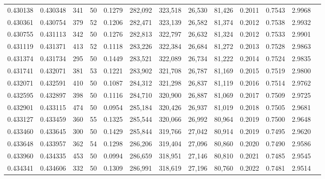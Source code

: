 \begin{tabular}{rrrrrrrrrrrrr}
0.430138 & 0.430348 &   341 &  50 &                                     0.1279 & 282,092 & 323,518 &  26,530 &  81,426 & 0.2011 & 0.7543 & 2.9968 \\
0.430361 & 0.430754 &   379 &  52 &                                     0.1206 & 282,471 & 323,139 &  26,582 &  81,374 & 0.2012 & 0.7538 & 2.9932 \\
0.430755 & 0.431113 &   342 &  50 &                                     0.1276 & 282,813 & 322,797 &  26,632 &  81,324 & 0.2012 & 0.7533 & 2.9901 \\
0.431119 & 0.431371 &   413 &  52 &                                     0.1118 & 283,226 & 322,384 &  26,684 &  81,272 & 0.2013 & 0.7528 & 2.9863 \\
0.431374 & 0.431734 &   295 &  50 &                                     0.1449 & 283,521 & 322,089 &  26,734 &  81,222 & 0.2014 & 0.7524 & 2.9835 \\
0.431741 & 0.432071 &   381 &  53 &                                     0.1221 & 283,902 & 321,708 &  26,787 &  81,169 & 0.2015 & 0.7519 & 2.9800 \\
0.432071 & 0.432591 &   410 &  50 &                                     0.1087 & 284,312 & 321,298 &  26,837 &  81,119 & 0.2016 & 0.7514 & 2.9762 \\
0.432595 & 0.432897 &   398 &  50 &                                     0.1116 & 284,710 & 320,900 &  26,887 &  81,069 & 0.2017 & 0.7509 & 2.9725 \\
0.432901 & 0.433115 &   474 &  50 &                                     0.0954 & 285,184 & 320,426 &  26,937 &  81,019 & 0.2018 & 0.7505 & 2.9681 \\
0.433127 & 0.433459 &   360 &  55 &                                     0.1325 & 285,544 & 320,066 &  26,992 &  80,964 & 0.2019 & 0.7500 & 2.9648 \\
0.433460 & 0.433645 &   300 &  50 &                                     0.1429 & 285,844 & 319,766 &  27,042 &  80,914 & 0.2019 & 0.7495 & 2.9620 \\
0.433648 & 0.433957 &   362 &  54 &                                     0.1298 & 286,206 & 319,404 &  27,096 &  80,860 & 0.2020 & 0.7490 & 2.9586 \\
0.433960 & 0.434335 &   453 &  50 &                                     0.0994 & 286,659 & 318,951 &  27,146 &  80,810 & 0.2021 & 0.7485 & 2.9545 \\
0.434341 & 0.434606 &   332 &  50 &                                     0.1309 & 286,991 & 318,619 &  27,196 &  80,760 & 0.2022 & 0.7481 & 2.9514 \\

\end{tabular}
